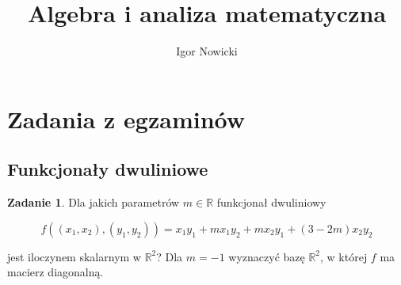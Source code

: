 \documentclass[11pt]{article}
\title{Algebra i analiza matematyczna}
\author{Igor Nowicki}
\theoremstyle{definition}
\newtheorem{zadanie}{Zadanie}
\begin{document}
\maketitle
\tableofcontents

\section{Zadania z egzaminów}

\subsection{Funkcjonały dwuliniowe}

\begin{zadanie}
    Dla jakich parametrów $m\in\mathbb R$ funkcjonał dwuliniowy

    $$f((x_1,x_2), (y_1,y_2)) = x_1y_1+mx_1y_2+mx_2y_1+(3-2m)x_2y_2$$

    jest iloczynem skalarnym w $\mathbb R^2$? Dla $m=-1$ wyznaczyć bazę $\mathbb R^2$, w której $f$ ma macierz diagonalną.
\end{zadanie}
\end{document}
